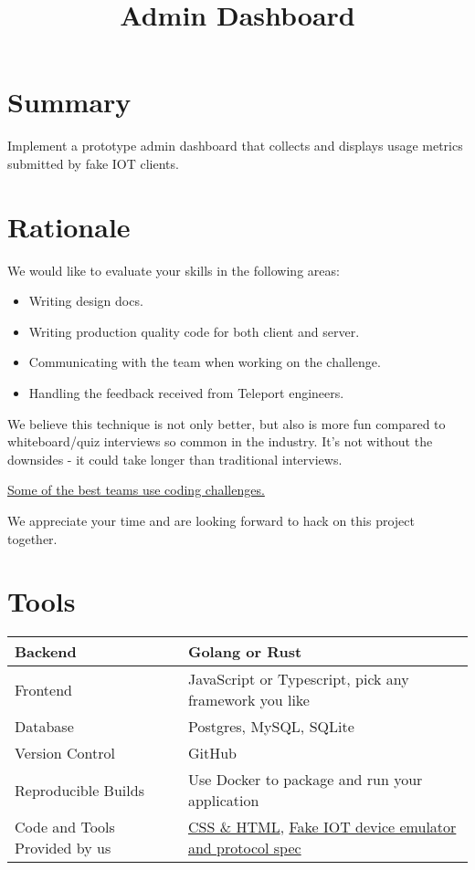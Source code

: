 \documentclass{article}
\begin{document}
\title{Admin Dashboard}

\section{Summary}

Implement a prototype admin dashboard that collects and displays usage metrics submitted
by fake IOT clients.

\section{Rationale}

We would like to evaluate your skills in the following areas:

\begin{itemize} %
  \item Writing design docs.
  \item Writing production quality code for both client and server.
  \item Communicating with the team when working on the challenge.
  \item Handling the feedback received from Teleport engineers.
\end{itemize}

We believe this technique is not only better, but also is more fun compared to whiteboard/quiz interviews so common in the industry. It's not without the downsides - it could take longer than traditional interviews.

\par

\href{https://sockpuppet.org/blog/2015/03/06/the-hiring-post/}{Some of the best teams use coding challenges.}

We appreciate your time and are looking forward to hack on this project together.

\section{Tools}

\begin{center}
\begin{tabular}{ | m{15em} | m{15em}| }
  \hline
  Backend & Golang or Rust \\
  \hline
  Frontend & JavaScript or Typescript, pick any framework you like \\
  \hline
  Database & Postgres, MySQL, SQLite \\
  \hline
  Version Control & GitHub \\
  \hline
  Reproducible Builds & Use Docker to package and run your application \\
  \hline
  Code and Tools Provided by us & \href{https://github.com/gravitational/challenge-user-management}{CSS \& HTML}, \href{https://github.com/gravitational/fakeiot}{Fake IOT device emulator and protocol spec} \\
  \hline
  \end{tabular}
\end{center}
\end{document}
